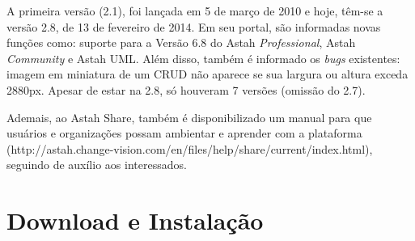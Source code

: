 \documentclass[12pt,a4paper]{article}
\begin{document}
A primeira versão (2.1), foi lançada em 5 de março de 2010 e hoje, têm-se a versão 2.8, de 13 de fevereiro de 2014. Em seu portal, são informadas novas funções como: suporte para a Versão 6.8 do Astah \textit{Professional}, Astah \textit{Community} e Astah UML. Além disso, também é informado os \textit{bugs} existentes: imagem em miniatura de um CRUD não aparece se sua largura ou altura exceda 2880px. Apesar de estar na 2.8, só houveram 7 versões (omissão do 2.7).

Ademais, ao Astah Share, também é disponibilizado um manual para que usuários e organizações possam ambientar e aprender com a plataforma (http://astah.change-vision.com/en/files/help/share/current/index.html), seguindo de auxílio aos interessados.

\section{Download e Instalação}%
\end{document}
